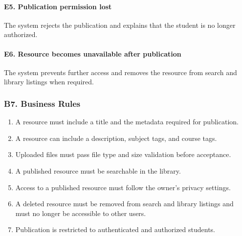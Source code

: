 \documentclass[12pt]{article}
\begin{document}
\paragraph*{E5. Publication permission lost}
\par\medskip

The system rejects the publication and explains that the student is no longer authorized.
\par\medskip

\hypertarget{sec:e6-resource-becomes-unavailable-after-publication}{}
\paragraph*{E6. Resource becomes unavailable after publication}
\par\medskip

The system prevents further access and removes the resource from search and library listings when required.
\par\medskip

\hypertarget{sec:b7-business-rules}{}
\subsubsection*{B7. Business Rules}
\par\medskip

\begin{enumerate}
\item A resource must include a title and the metadata required for publication.
\item A resource can include a description, subject tags, and course tags.
\item Uploaded files must pass file type and size validation before acceptance.
\item A published resource must be searchable in the library.
\item Access to a published resource must follow the owner's privacy settings.
\item A deleted resource must be removed from search and library listings and must no longer be accessible to other users.
\item Publication is restricted to authenticated and authorized students.
\end{enumerate}
\par\medskip

\hypertarget{sec:b8-special-requirements}{}
\end{document}

